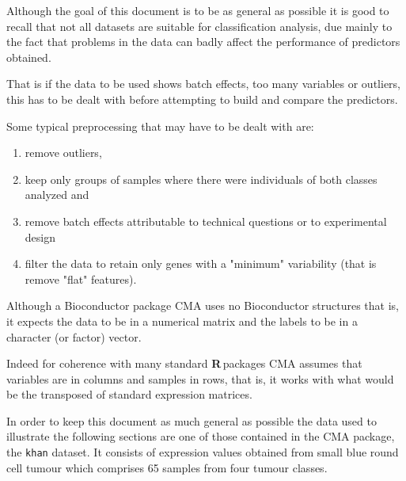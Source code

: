 \documentclass{article}\usepackage[]{graphicx}\usepackage[]{color}
\newcommand{\R}{\textbf{R}\,}
\begin{document}
Although the goal of this document is to be as general as possible it
is good to recall that not all datasets are suitable for
classification analysis, due mainly to the fact that problems in the
data can badly affect the performance of predictors obtained.

That is if the data to be used shows batch effects, too many variables
or outliers, this has to be dealt with before attempting to build
and compare the predictors.

Some typical preprocessing that may have to be dealt with are:
\begin{enumerate}
\item remove outliers, 
\item keep only groups of samples where there were individuals of both classes analyzed and
\item remove batch effects attributable to technical questions or to experimental design
\item filter the data to retain only genes with a "minimum" variability (that is remove "flat" features).
\end{enumerate}

Although a Bioconductor package CMA uses no Bioconductor structures
that is, it expects the data to be in a numerical matrix and the labels
to be in a character (or factor) vector.

Indeed for coherence with many standard \R packages CMA assumes that variables are in columns and samples in rows, that is, it works with what would be the transposed of standard expression matrices.

In order to keep this document as much general as possible the data used to illustrate the following sections are one of those contained in the CMA package, the \texttt{khan} dataset. It consists of expression values obtained from small blue round cell tumour which
comprises 65 samples from four tumour classes.
\end{document}
